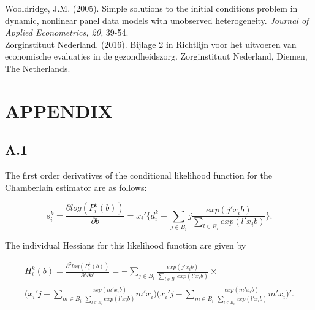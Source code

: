 \documentclass[12pt]{article}
\begin{document}
\noindent Wooldridge, J.M. (2005). Simple solutions to the initial conditions problem in dynamic, nonlinear panel data models with unobserved heterogeneity. \textit{Journal of Applied Econometrics, 20,} 39-54.\\

\noindent Zorginstituut Nederland. (2016). Bijlage 2 in Richtlijn voor het uitvoeren van economische evaluaties in de gezondheidszorg. Zorginstituut Nederland, Diemen, The Netherlands.

\newpage 

\section*{\centering APPENDIX}
\subsection*{A.1}
The first order derivatives of the conditional likelihood function for the Chamberlain estimator are as follows:

\[
    s_{i}^k=\frac{\partial log(P_{i}^k(b))}{\partial b} = x_{i}'\Bigg\{ d_{i}^k - \sum_{j \in B_{i}}{j\frac{exp(j'x_{i}b)}{\sum_{l \in B_{i}}{exp(l'x_{i}b)}}} \Bigg\}.
\]

\noindent The individual Hessians for this likelihood function are given by

\[
    \begin{split}
        H_{i}^k(b) = \frac{\partial^2 log(P_{i}^k(b))}{\partial b\partial b'} = - \sum_{j \in B_{i}}{\frac{exp(j'x_{i}b)}{\sum_{l \in B_{i}}{exp(l'x_{i}b)}}} \times \\
        \Bigg( x_{i}'j - \sum_{m \in B_{i}}{\frac{exp(m'x_{i}b)}{\sum_{l \in B_{i}}{exp(l'x_{i}b)}}m'x_{i}} \Bigg)\Bigg( x_{i}'j - \sum_{m \in B_{i}}{\frac{exp(m'x_{i}b)}{\sum_{l \in B_{i}}{exp(l'x_{i}b)}}m'x_{i}} \Bigg)'.
    \end{split}
\]

\FloatBarrier

\end{document}
